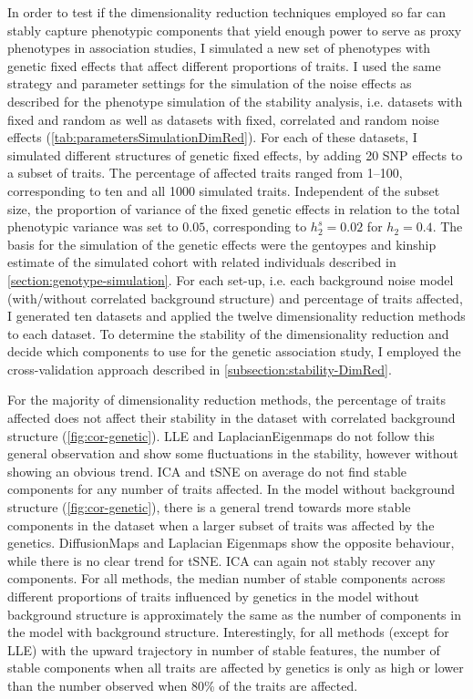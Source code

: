 In order to test if the dimensionality reduction techniques employed so far can stably capture phenotypic components that yield enough power to serve as proxy phenotypes in association studies, I simulated a new set of phenotypes with genetic fixed effects that affect different proportions of traits. I used the same strategy and parameter settings for the simulation of the noise effects as described for the phenotype simulation of the stability analysis, i.e. datasets with fixed and random as well as datasets with fixed, correlated and random noise effects (\cref{tab:parametersSimulationDimRed}). For each of these datasets, I simulated different structures of genetic fixed effects, by adding \num{20} SNP effects to a subset of traits.  The percentage of affected traits ranged from \numrange{1}{100}, corresponding to ten and all \num{1000} simulated traits. Independent of the subset size, the proportion of variance of the fixed genetic effects in relation to the total phenotypic variance was set to \(0.05\), corresponding to \(h^s_2=0.02\) for \(h_2=0.4\). The basis for the simulation of the genetic effects were the gentoypes and kinship estimate of the simulated cohort with related individuals described in \cref{section:genotype-simulation}.  For each set-up, i.e. each background noise model (with/without correlated background structure) and percentage of traits affected, I generated ten datasets and applied the twelve dimensionality reduction methods to each dataset. To determine the stability of the dimensionality reduction and decide which components to use for the genetic association study, I employed the cross-validation approach described in \cref{subsection:stability-DimRed}. 

For the majority of dimensionality reduction methods, the percentage of traits affected does not affect their stability in the dataset with correlated background structure (\cref{fig:cor-genetic}). LLE and LaplacianEigenmaps do not follow this general observation and show some fluctuations in the stability, however without showing an obvious trend.  ICA and tSNE on average do not find stable components for any number of traits affected. In the model without background structure (\cref{fig:cor-genetic}), there is a general trend towards more stable components in the dataset when a larger subset of traits was affected by the genetics. DiffusionMaps and Laplacian Eigenmaps show the opposite behaviour, while there is no clear trend for tSNE. ICA can again not stably recover any components. For all methods, the median number of stable components across different proportions of traits influenced by genetics in the model without background structure is approximately the same as the number of components in the model with background structure. Interestingly, for all methods (except for LLE) with the upward trajectory in number of stable features, the number of stable components when all traits are affected by genetics is only as high or lower than the number observed when \num{80}\% of the traits are affected. 

